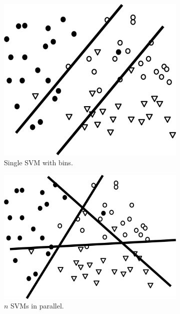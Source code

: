 \begin{figure}
\begin{subfigure}[b]{0.32\textwidth}  
            \centering 
            \includegraphics[width=.85\textwidth]{parts/chap-2/img-2/svm-par.png}
            \caption{Single SVM with bins.} 
            \label{mach:svm-model-gr-1}
        \end{subfigure}
        \hfill
        \begin{subfigure}[b]{0.32\textwidth}  
            \centering 
            \includegraphics[width=.98\textwidth]{parts/chap-2/img-2/svm-multi.png}
            \caption{$n$ SVMs in parallel.} 
            \label{mach:svm-model-gr-2}
        \end{subfigure}
        \hfill
        \begin{subfigure}[b]{0.32\textwidth}   

\end{subfigure}
\end{figure}
